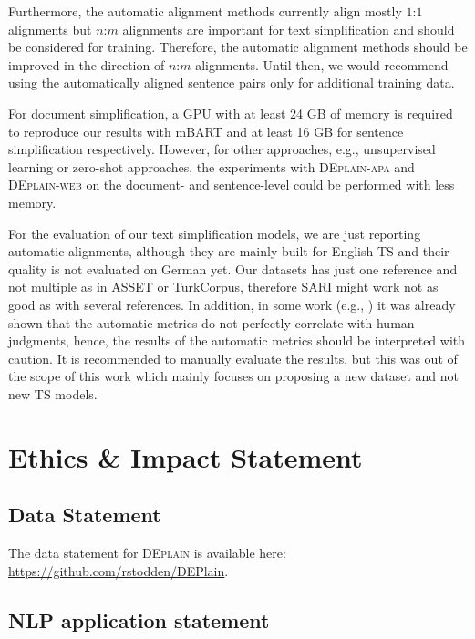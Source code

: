 \documentclass[11pt]{article}
\begin{document}
Furthermore, the automatic alignment methods currently align mostly $1$:$1$ alignments but $n$:$m$ alignments are important for text simplification and should be considered for training. Therefore, the automatic alignment methods should be improved in the direction of $n$:$m$ alignments. Until then, we would recommend using the automatically aligned sentence pairs only for additional training data.\par
For document simplification, a GPU with at least 24 GB of memory is required to reproduce our results with mBART and at least 16 GB for sentence simplification respectively. However, for other approaches, e.g., unsupervised learning or zero-shot approaches, the experiments with \textsc{DEplain-apa} and \textsc{DEplain-web} on the document- and sentence-level could be performed with less memory. 

For the evaluation of our text simplification models, we are just reporting automatic alignments, although they are mainly built for English TS and their quality is not evaluated on German yet. 
Our datasets has just one reference and not multiple as in ASSET or TurkCorpus, therefore SARI might work not as good as with several references. 
In addition, in some work (e.g., \citet{alva-manchego-etal-2021-un}) it was already shown that the automatic metrics do not perfectly correlate with human judgments, hence, the results of the automatic metrics should be interpreted with caution. It is recommended to manually evaluate the results, but this was out of the scope of this work which mainly focuses on proposing a new dataset and not new TS models.



\newpage
\section*{Ethics \& Impact Statement}
\subsection*{Data Statement}
The data statement for \textsc{DEplain} is available here: \url{https://github.com/rstodden/DEPlain}. 


\subsection*{NLP application statement}
\end{document}
